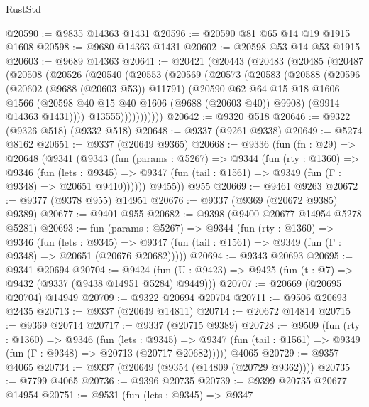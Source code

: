 \begin{lexlean}{RustStd}
\begin{coremodule}
@20590 := @9835 @14363 @1431
@20596 := @20590 @81 @65 @14 @19 @1915 @1608
@20598 := @9680 @14363 @1431
@20602 := @20598 @53 @14 @53 @1915
@20603 := @9689 @14363
@20641 := @20421
    (@20443
      (@20483
        (@20485
          (@20487
            (@20508
              (@20526
                (@20540
                  (@20553
                    (@20569
                      (@20573
                        (@20583
                          (@20588
                            (@20596
                              (@20602 (@9688 (@20603 @53)) @11791)
                              (@20590
                                @62
                                @64
                                @15
                                @18
                                @1606
                                @1566
                                (@20598 @40 @15 @40 @1606 (@9688 (@20603 @40)) @9908)
                                (@9914 @14363 @1431))))
                          @13555)))))))))))
@20642 := @9320 @518
@20646 := @9322 (@9326 @518) (@9332 @518)
@20648 := @9337 (@9261 @9338)
@20649 := @5274 @8162
@20651 := @9337 (@20649 @9365)
@20668 := @9336
    (fun (fn : @29) =>
    @20648
      (@9341
        (@9343
          (fun (params : @5267) =>
          @9344
            (fun (rty : @1360) =>
            @9346
              (fun (lets : @9345) =>
              @9347 (fun (tail : @1561) => @9349 (fun (Γ : @9348) => @20651 @9410))))))
        @9455))
    @955
@20669 := @9461 @9263
@20672 := @9377 (@9378 @955) @14951
@20676 := @9337 (@9369 (@20672 @9385) @9389)
@20677 := @9401 @955
@20682 := @9398 (@9400 @20677 @14954 @5278 @5281)
@20693 := fun (params : @5267) =>
  @9344
    (fun (rty : @1360) =>
    @9346
      (fun (lets : @9345) =>
      @9347 (fun (tail : @1561) => @9349 (fun (Γ : @9348) => @20651 (@20676 @20682)))))
@20694 := @9343 @20693
@20695 := @9341 @20694
@20704 := @9424
    (fun (U : @9423) => @9425 (fun (t : @7) => @9432 (@9337 (@9438 @14951 @5284) @9449)))
@20707 := @20669 (@20695 @20704) @14949
@20709 := @9322 @20694 @20704
@20711 := @9506 @20693 @2435
@20713 := @9337 (@20649 @14811)
@20714 := @20672 @14814
@20715 := @9369 @20714
@20717 := @9337 (@20715 @9389)
@20728 := @9509
    (fun (rty : @1360) =>
    @9346
      (fun (lets : @9345) =>
      @9347 (fun (tail : @1561) => @9349 (fun (Γ : @9348) => @20713 (@20717 @20682)))))
    @4065
@20729 := @9357 @4065
@20734 := @9337 (@20649 (@9354 (@14809 (@20729 @9362))))
@20735 := @7799 @4065
@20736 := @9396 @20735
@20739 := @9399 @20735 @20677 @14954
@20751 := @9531
    (fun (lets : @9345) =>
    @9347

\end{coremodule}
\end{lexlean}
